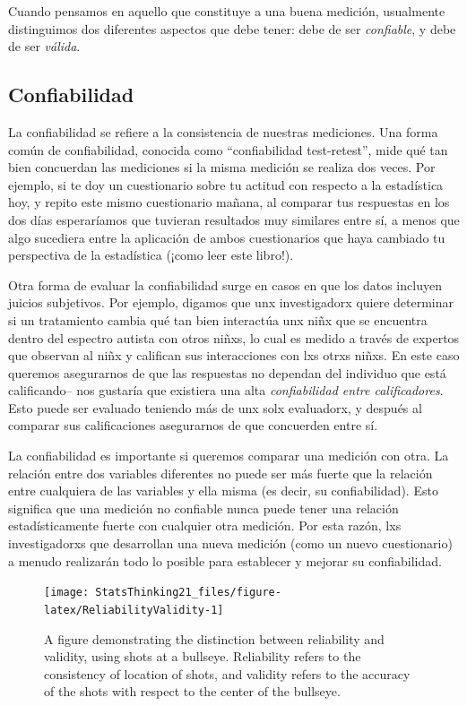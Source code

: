 \documentclass[
  12pt,
]{book}
\begin{document}
Cuando pensamos en aquello que constituye a una buena medición, usualmente distinguimos dos diferentes aspectos que debe tener: debe de ser \emph{confiable}, y debe de ser \emph{válida}.

\hypertarget{confiabilidad}{%
\subsection{Confiabilidad}\label{confiabilidad}}

La confiabilidad se refiere a la consistencia de nuestras mediciones. Una forma común de confiabilidad, conocida como ``confiabilidad test-retest'', mide qué tan bien concuerdan las mediciones si la misma medición se realiza dos veces. Por ejemplo, si te doy un cuestionario sobre tu actitud con respecto a la estadística hoy, y repito este mismo cuestionario mañana, al comparar tus respuestas en los dos días esperaríamos que tuvieran resultados muy similares entre sí, a menos que algo sucediera entre la aplicación de ambos cuestionarios que haya cambiado tu perspectiva de la estadística (¡como leer este libro!).

Otra forma de evaluar la confiabilidad surge en casos en que los datos incluyen juicios subjetivos. Por ejemplo, digamos que unx investigadorx quiere determinar si un tratamiento cambia qué tan bien interactúa unx niñx que se encuentra dentro del espectro autista con otros niñxs, lo cual es medido a través de expertos que observan al niñx y califican sus interacciones con lxs otrxs niñxs. En este caso queremos asegurarnos de que las respuestas no dependan del individuo que está calificando-- nos gustaría que existiera una alta \emph{confiabilidad entre calificadores}. Esto puede ser evaluado teniendo más de unx solx evaluadorx, y después al comparar sus calificaciones asegurarnos de que concuerden entre sí.

La confiabilidad es importante si queremos comparar una medición con otra. La relación entre dos variables diferentes no puede ser más fuerte que la relación entre cualquiera de las variables y ella misma (es decir, su confiabilidad). Esto significa que una medición no confiable nunca puede tener una relación estadísticamente fuerte con cualquier otra medición. Por esta razón, lxs investigadorxs que desarrollan una nueva medición (como un nuevo cuestionario) a menudo realizarán todo lo posible para establecer y mejorar su confiabilidad.

\begin{figure}
\texttt{[image: StatsThinking21\_files/figure-latex/ReliabilityValidity-1]} \caption{A figure demonstrating the distinction between reliability and validity, using shots at a bullseye. Reliability refers to the consistency of location of shots, and validity refers to the accuracy of the shots with respect to the center of the bullseye. }\label{fig:ReliabilityValidity}
\end{figure}
\end{document}
